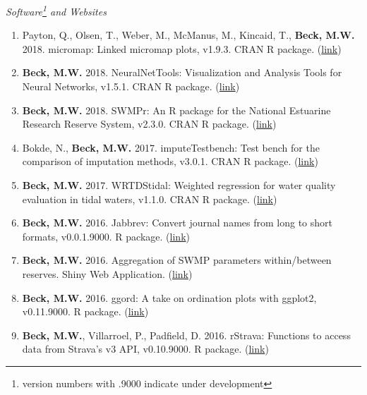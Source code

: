 \documentclass[letterpaper,12pt]{article}
\begin{document}
\vspace{\baselineskip} 
\centerline{\large{\textit{Software\footnote{version numbers with .9000 indicate under development} and Websites}}}

\begin{enumerate}

\item Payton, Q., Olsen, T., Weber, M., McManus, M., Kincaid, T., \textbf{Beck, M.W.} 2018. micromap: Linked micromap plots, v1.9.3. CRAN R package. (\href{https://cran.r-project.org/web/packages/micromap/index.html}{link})

\item \textbf{Beck, M.W.} 2018. NeuralNetTools: Visualization and Analysis Tools for Neural Networks, v1.5.1. CRAN R package. (\href{http://cran.r-project.org/web/packages/NeuralNetTools/}{link})

\item \textbf{Beck, M.W.} 2018. SWMPr: An R package for the National Estuarine Research Reserve System, v2.3.0. CRAN R package. (\href{https://cran.r-project.org/web/packages/SWMPr/index.html}{link})

\item Bokde, N., \textbf{Beck, M.W.} 2017. imputeTestbench: Test bench for the comparison of imputation methods, v3.0.1. CRAN R package. (\href{https://cran.r-project.org/web/packages/imputeTestbench/index.html}{link})

\item \textbf{Beck, M.W.} 2017. WRTDStidal: Weighted regression for water quality evaluation in tidal waters, v1.1.0. CRAN R package. (\href{https://cran.r-project.org/web/packages/WRTDStidal/index.html}{link})

\item \textbf{Beck, M.W.} 2016. Jabbrev: Convert journal names from long to short formats, v0.0.1.9000. R package. (\href{https://github.com/fawda123/Jabbrev}{link})

\item \textbf{Beck, M.W.} 2016. Aggregation of SWMP parameters within/between reserves. Shiny Web Application. (\href{
http://beckmw.shinyapps.io/swmp_agg}{link})

\item \textbf{Beck, M.W.} 2016. ggord: A take on ordination plots with ggplot2, v0.11.9000. R package. (\href{https://github.com/fawda123/ggord}{link})

\item \textbf{Beck, M.W.}, Villarroel, P., Padfield, D. 2016. rStrava: Functions to access data from Strava's v3 API, v0.10.9000. R package. (\href{https://github.com/fawda123/rStrava}{link})


\end{enumerate}
\end{document}
